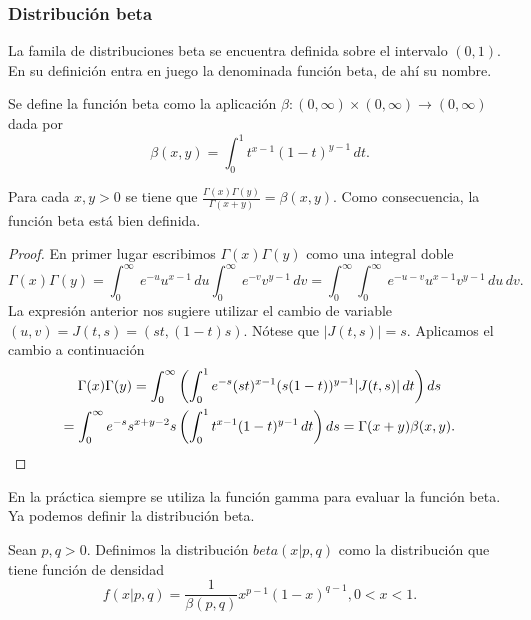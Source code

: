 \subsubsection{Distribución beta}

La famila de distribuciones beta se encuentra definida sobre el intervalo $(0, 1)$. En su definición entra en juego la denominada función beta, de ahí su nombre.

\begin{definition}
    Se define la función beta como la aplicación $\beta : (0, \infty) \times (0, \infty) \to (0, \infty)$ dada por
    \[\beta(x, y) = \int_0^1 t^{x-1}(1-t)^{y-1}\,dt.\]
\end{definition}
\begin{prop} \label{prop:beta-gamma}
    Para cada $x, y > 0$ se tiene que $\frac{\Gamma(x)\Gamma(y)}{\Gamma(x+y)} = \beta(x,y)$. Como consecuencia, la función beta está bien definida.
\end{prop}
\begin{proof}
    En primer lugar escribimos $\Gamma(x)\Gamma(y)$ como una integral doble
    \begin{equation*}
        \Gamma(x)\Gamma(y) =\int_{0}^{\infty }\ e^{-u}u^{x-1}\,d u\int_{0}^{\infty }\ e^{-v}v^{y-1}\,d v
        =\int_{0}^{\infty }\int_{0}^{\infty }\ e^{-u-v}u^{x-1}v^{y-1}\,d u\,d v.
    \end{equation*}
    La expresión anterior nos sugiere utilizar el cambio de variable $(u, v) = J(t,s) = (st, (1-t)s)$. Nótese que $|J(t,s)| = s$. Aplicamos el cambio a continuación
    \begin{gather*}
        \Gamma(x)\Gamma(y) = \int_{0}^{\infty} \left( \int_{0}^{1}e^{-s}(st)^{x-1}(s(1-t))^{y-1}|J(t,s)|\, d t \right) ds \\
        = \int_{0}^{\infty }e^{-s}s^{x+y-2}s \left(\int_{0}^{1}t^{x-1}(1-t)^{y-1}\,dt \right) d s =\Gamma(x+y)\beta(x,y).  \qedhere
    \end{gather*}
\end{proof}

En la práctica siempre se utiliza la función gamma para evaluar la función beta. Ya podemos definir la distribución beta.

\begin{definition}
    Sean $p, q > 0$. Definimos la distribución $beta(x | p, q)$ como la distribución que tiene función de densidad
    \[f(x | p, q) = \frac{1}{\beta(p,q)}x^{p-1}(1-x)^{q-1}, 0 < x < 1.\]
\end{definition}

